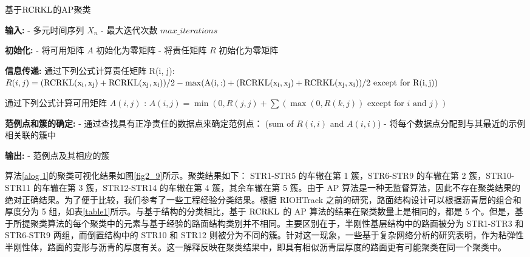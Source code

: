 \begin{algorithm}[htbp]
\caption{基于$\rm{RCRKL}$的AP聚类} \label{alog 1}
\label{alg:SA1}

\begin{algorithmic}[1]
\STATE \textbf{输入:}
\STATE - 多元时间序列 $X_n$
\STATE - 最大迭代次数 $max\_iterations$

\STATE \textbf{初始化:}
\STATE -  将可用矩阵 $A$ 初始化为零矩阵
\STATE - 将责任矩阵 $R$ 初始化为零矩阵

\STATE \textbf{信息传递:}
            \STATE 通过下列公式计算责任矩阵 R(i, j):
            \STATE $R(i, j)=(\rm{RCRKL}(x_i, x_j)+\rm{RCRKL}(x_j, x_i)) / 2-\max(A(i, :)+(\rm{RCRKL}(x_i, x_j)+\rm{RCRKL}(x_j, x_i)) / 2 \text{ except for } R(i, j))$
        \ENDFOR
    \ENDFOR

            \STATE 通过下列公式计算可用矩阵 $A(i, j)$ :
            \STATE $A(i, j) = \min(0, R(j, j) + \sum(\max(0, R(k, j)) \text{ except for } i \text{ and } j))$
        \ENDFOR
    \ENDFOR
\ENDFOR

\STATE \textbf{范例点和簇的确定:}
\STATE - 通过查找具有正净责任的数据点来确定范例点： (sum of $R(i, i)$ and $A(i, i)$)
\STATE - 将每个数据点分配到与其最近的示例相关联的簇中

\STATE \textbf{输出:}
\STATE - 范例点及其相应的簇

\end{algorithmic}
\end{algorithm}

算法\ref{alog 1}的聚类可视化结果如图\ref{fig2_9}所示。聚类结果如下： STR1-STR5 的车辙在第 1 簇，STR6-STR9 的车辙在第 2 簇，STR10-STR11 的车辙在第 3 簇，STR12-STR14 的车辙在第 4 簇，其余车辙在第 5 簇。由于 AP 算法是一种无监督算法，因此不存在聚类结果的绝对正确结果。为了便于比较，我们参考了一些工程经验分类结果。根据 RIOHTrack 之前的研究，路面结构设计可以根据沥青层的组合和厚度分为 5 组，如表\ref{table1}所示。与基于结构的分类相比，基于 $\rm{RCRKL}$ 的 AP 算法的结果在聚类数量上是相同的，都是 5 个。但是，基于所提聚类算法的每个聚类中的元素与基于经验的路面结构类别并不相同。主要区别在于，半刚性基层结构中的路面被分为 STR1-STR3 和 STR6-STR9 两组，而倒置结构中的 STR10 和 STR12 则被分为不同的簇。针对这一现象，一些基于复杂网络分析的研究表明，作为粘弹性半刚性体，路面的变形与沥青的厚度有关。这一解释反映在聚类结果中，即具有相似沥青层厚度的路面更有可能聚类在同一个聚类中\cite{29}。


